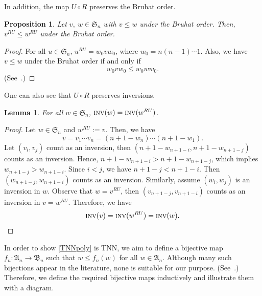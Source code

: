 \documentclass[12pt]{amsart}
\newtheorem{prop}[thm]{Proposition}
\newtheorem{lem}[thm]{Lemma}
\theoremstyle{definition}
\numberwithin{equation}{section}
\newcommand{\sn}{\mathfrak{S}_n}
\newcommand{\inv}{\textsc{inv}}
\newcommand{\defeq}{:=}
\begin{document}
In addition, the map $U\circ R$ preserves the Bruhat order.

\begin{prop}\label{upside-down reverse}
    Let $v, \ w \in \sn$ with $v \leq w$ under the Bruhat order. Then, $v^{RU} \leq w^{RU} $ under the Bruhat order.
\end{prop}

\begin{proof}
    For all $u\in \sn$, $u^{RU} = w_0vw_0$, where $w_0 = n(n-1)\cdots 1$. Also, we have $v \leq w$ under the Bruhat order if and only if
    \begin{equation*}
    w_0vw_0 \leq w_0 w w_0.
    \end{equation*} (See~\cite[p.~36--38]{BBCoxeter}.)
\end{proof}

One can also see that $U\circ R$ preserves inversions.

\begin{lem}\label{l:RU inv}
    For all $w\in \sn$, $\inv (w) = \inv (w^{RU})$.
\end{lem}
\begin{proof}
    Let $w \in \sn$ and $w^{RU} \defeq v$. Then, we have \begin{equation*}
        v = v_1 \cdots v_n = (n+1 - w_n) \cdots (n+1 -w_1).
    \end{equation*} Let $(v_i,v_j)$ count as an inversion, then $(n+1-w_{n+1-i}, n+1-w_{n+1-j})$ counts as an inversion. Hence, $n+1-w_{n+1-i} > n+1-w_{n+1-j}$, which implies $w_{n+1-j} > w_{n+1-i}$. Since $i<j$, we have $n+1-j < n+1-i$. Then $(w_{n+1-j},w_{n+1-i})$ counts as an inversion. Similarly, assume $(w_i,w_j)$ is an inversion in $w$. Observe that $w=v^{RU}$, then $(v_{n+1-j},v_{n+1-i})$ counts as an inversion in $v = w^{RU}$. Therefore, we have\begin{equation*}
        \inv (v) = \inv (w^{RU}) = \inv (w).
    \end{equation*}
    \end{proof}

In order to show \eqref{TNNpoly} is TNN, we aim to define a bijective map $f_n: \mathfrak{A}_n\rightarrow \mathfrak{B}_n$ such that $w \leq f_n (w)$ for all $w\in \mathfrak A_n$. Although many such bijections appear in the literature, none is suitable for our purpose. (See~\cite{KFRFPAP}.) Therefore, we define the required bijective maps inductively and illustrate them with a diagram.
\end{document}
